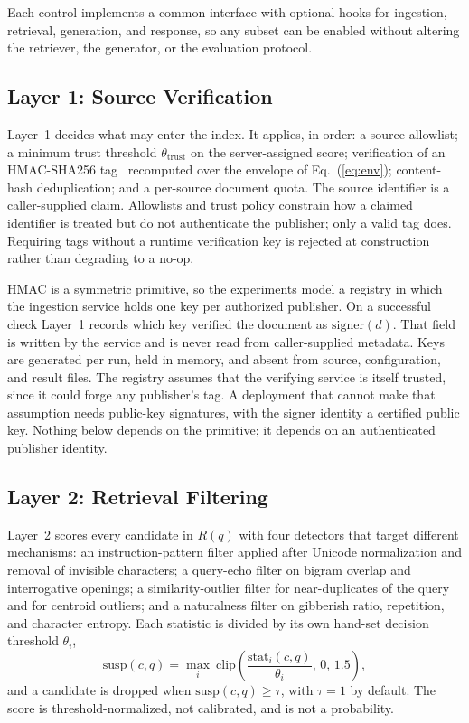 \documentclass[lettersize,journal]{IEEEtran}
\begin{document}
Each control implements a common interface with optional hooks for ingestion, retrieval,
generation, and response, so any subset can be enabled without altering the retriever, the
generator, or the evaluation protocol.

\subsection{Layer 1: Source Verification}
\label{sec:layer1}

Layer~1 decides what may enter the index. It applies, in order: a source allowlist; a minimum
trust threshold $\theta_{\mathrm{trust}}$ on the server-assigned score; verification of an
HMAC-SHA256 tag~\cite{krawczyk1997hmac} recomputed over the envelope of Eq.~(\ref{eq:env});
content-hash deduplication; and a per-source document quota. The source identifier is a
caller-supplied claim. Allowlists and trust policy constrain how a claimed identifier is
treated but do not authenticate the publisher; only a valid tag does. Requiring tags without a
runtime verification key is rejected at construction rather than degrading to a no-op.

HMAC is a symmetric primitive, so the experiments model a registry in which the ingestion
service holds one key per authorized publisher. On a successful check Layer~1 records which
key verified the document as $\mathrm{signer}(d)$. That field is written by the service and is
never read from caller-supplied metadata. Keys are generated per run, held in memory, and
absent from source, configuration, and result files. The registry assumes that the verifying
service is itself trusted, since it could forge any publisher's tag. A deployment that cannot
make that assumption needs public-key signatures, with the signer identity a certified public
key. Nothing below depends on the primitive; it depends on an authenticated publisher identity.

\subsection{Layer 2: Retrieval Filtering}

Layer~2 scores every candidate in $R(q)$ with four detectors that target different mechanisms:
an instruction-pattern filter applied after Unicode normalization and removal of invisible
characters; a query-echo filter on bigram overlap and interrogative openings; a
similarity-outlier filter for near-duplicates of the query and for centroid outliers; and a
naturalness filter on gibberish ratio, repetition, and character entropy. Each statistic is
divided by its own hand-set decision threshold $\theta_i$,
\begin{equation}
\mathrm{susp}(c, q) = \max_i\ \mathrm{clip}\!\left(\frac{\mathrm{stat}_i(c, q)}{\theta_i},\, 0,\, 1.5\right),
\label{eq:suspicion}
\end{equation}
and a candidate is dropped when $\mathrm{susp}(c,q) \ge \tau$, with $\tau = 1$ by default. The
score is threshold-normalized, not calibrated, and is not a probability.
\end{document}
